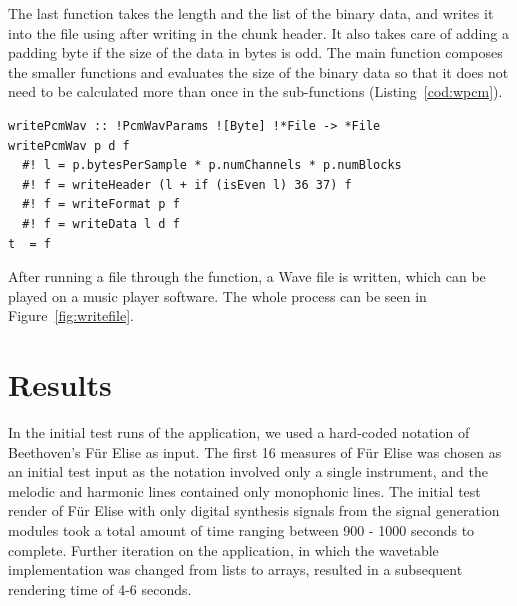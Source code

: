 \documentclass[runningheads]{llncs}
\begin{document}
The last function takes the length and the list of the binary data,
and writes it into the file using  after writing in
the chunk header. It also takes care of adding a padding byte if the
size of the data in bytes is odd.
The main function composes the smaller functions and evaluates the size
of the binary data so that it does not need to be calculated more than
once in the sub-functions (Listing~\ref{cod:wpcm}).
\begin{lstlisting}[language=Clean,label={cod:wpcm},captionpos=b,caption={The main function for writing Wave files}]
writePcmWav :: !PcmWavParams ![Byte] !*File -> *File
writePcmWav p d f
  #! l = p.bytesPerSample * p.numChannels * p.numBlocks
  #! f = writeHeader (l + if (isEven l) 36 37) f
  #! f = writeFormat p f
  #! f = writeData l d f
t  = f
\end{lstlisting}

After running a file through the function, a Wave file is
written, which can be played on a music player software.
The whole process can be seen in Figure~\ref{fig:writefile}.

\section{Results}\label{sec:Results}

In the initial test runs of the application, we used a hard-coded notation of Beethoven's F\"ur Elise as input. The first 16 measures of F\"ur Elise was chosen as an initial test input as the notation involved only a single instrument, and the melodic and harmonic lines contained only monophonic lines. The initial test render of F\"ur Elise with only digital synthesis signals from the signal generation modules took a total amount of time ranging between 900 - 1000 seconds to complete. Further iteration on the application, in which the wavetable implementation was changed from lists to arrays, resulted in a subsequent rendering time of 4-6 seconds.
\end{document}
